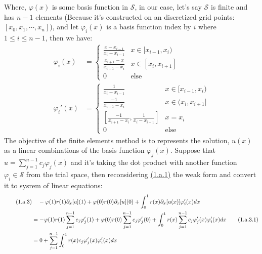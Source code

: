 \documentclass[]{article}
\begin{document}
        Where, $\varphi(x)$ is some basis function in $\mathcal{S}$, in our case, let's say $\mathcal{S}$ is finite and has $n - 1$ elements (Because it's constructed on an discretized grid points: $[x_0, x_1, \cdots, x_n]$), and let $\varphi_i(x)$ is a basis function index by $i$ where $1\le i \le n -1$, then we have: 
        \begin{align*}\tag{1.a.2}\label{eqn:1.a.2}
            \varphi_i(x) &= 
            \begin{cases}
                \frac{x - x_{i - 1}}{x_i - x_{i - 1}} & x\in [x_{i - 1}, x_i)
                \\
                \frac{x_{i + 1} - x}{x_{i + 1} - x_{i}} & x\in [x_{i}, x_{i + 1}]
                \\
                0 & \text{else}
            \end{cases}
            \\
            \varphi_i'(x) &= \begin{cases}
                \frac{1}{x_{i} - x_{i - 1}} & x \in [x_{i - 1}, x_i)
                \\
                \frac{-1}{x_{i + 1} - x_{i}} & x \in (x_{i}, x_{i + 1}]
                \\
                \left[
                    \frac{-1}{x_{i + 1} - x_i}, \frac{1}{x_i - x_{i - 1}}
                \right]
                & x = x_i
                \\
                0 & \text{else}
            \end{cases}
        \end{align*}
        The objective of the finite elements method is to represents the solution, $u(x)$ as a linear combinations of the basis function $\varphi_j(x)$. Suppose that $\hat{u} = \sum_{j = 1}^{n - 1}c_j \varphi_j(x)$ and it's taking the dot product with another function $\varphi_i \in \mathcal{S}$ from the trial space, then reconsidering \hyperref[eqn:1.a.1]{(1.a.1)} the weak form and convert it to sysrem of linear equations: 
        \begin{align*}\tag{1.a.3}\label{eqn:1.a.3}
            &\hspace{1.1em} 
            -\varphi(1)r(1)\partial_x[u](1) + \varphi(0)r(0)\partial_x[u](0)
            + 
            \int_{0}^{1} 
                r(x)\partial_x[u(x)]\varphi_i'(x)
            dx
            \\
            &= 
            - \varphi(1)r(1)
            \sum_{j = 1}^{n - 1}
                c_j\varphi'_j(1)
            +
            \varphi(0)r(0)
            \sum_{j = 1}^{n - 1}
                c_j\varphi'_j(0)
            +
            \int_{0}^{1} 
                r(x)
                \sum_{j = 1}^{n - 1}c_j\varphi_j'(x)
                \varphi_i'(x)
            dx \tag{1.a.3.1}
            \\
            &= 0 + \sum_{j = 1}^{n - 1}
                \int_{0}^{1} 
                    r(x)c_j\varphi_j'(x)\varphi_i'(x)
                dx
        \end{align*}
\end{document}
